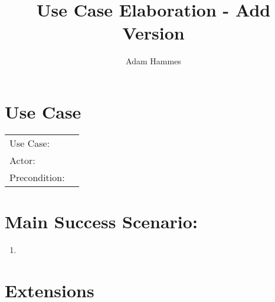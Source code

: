 \documentclass{article}
\title{Use Case Elaboration - Add Version}
\author{Adam Hammes}
\begin{document}
\maketitle

\section*{Use Case}

\begin{tabular}{l l}
  Use Case:     & \\
  Actor:        &   \\
  Precondition: &      \\
\end{tabular}

\section*{Main Success Scenario:}

\begin{enumerate}
  \item 
\end{enumerate}

\section*{Extensions}
\end{document}
